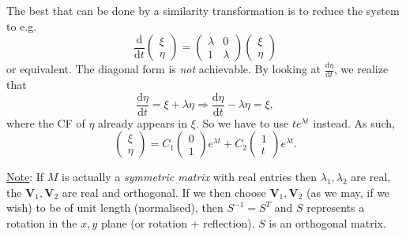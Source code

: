 \documentclass[12pt]{report}
\theoremstyle{definition}
\begin{document}
\begin{itemize}
\begin{enumerate}[label = (\roman*)]
                    The best that can be done by a similarity transformation
                    is to reduce the system to e.g.\[
                        \frac{\mathrm{d}}{\mathrm{d}t} \begin{pmatrix}
                                \xi \\
                                \eta
                        \end{pmatrix} = \begin{pmatrix}
                        \lambda & 0 \\
                        1 & \lambda
                        \end{pmatrix} \begin{pmatrix}
                                \xi \\
                                \eta
                        \end{pmatrix}
                    \]or equivalent. The diagonal form is \emph{not} achievable. 
                    By looking at $\frac{\mathrm{d}\eta}{\mathrm{d}t} $, we realize that\[
                        \frac{\mathrm{d}\eta}{\mathrm{d}t} = \xi + \lambda \eta
                        \Rightarrow{}\frac{\mathrm{d}\eta}{\mathrm{d}t} - \lambda \eta = \xi,
                    \]
                    where the CF of $\eta$ already appears in $\xi$.
                    So we have to use $t e^{\lambda t}$ instead. As such,\[
                        \begin{pmatrix}
                                \xi \\
                                \eta
                        \end{pmatrix} = C_1 \begin{pmatrix}
                                0 \\
                                1
                        \end{pmatrix} e^{\lambda t} + C_2 \begin{pmatrix}
                                1 \\
                                t
                        \end{pmatrix} e^{\lambda t}.
                    \]
            \end{enumerate}
\end{itemize}

\underline{Note}: If $M$ is actually a \emph{symmetric matrix} with real entries then
$\lambda_1, \lambda_2$ are real, the $\pmb{V}_1, \pmb{V}_2$ are real and orthogonal.
If we then choose $\pmb{V}_1, \pmb{V}_2$ (as we may, if we wish) to be of unit length (normalised),
then $S^{-1} = S^{T}$ and $S$ represents a rotation in the $x, y$ plane (or rotation + reflection).
$S$ is an orthogonal matrix.
\end{document}
